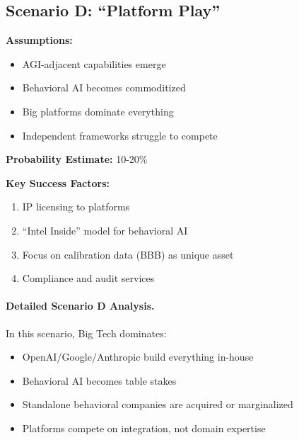 \subsection{Scenario D: ``Platform Play''}

\begin{tcolorbox}[colback=blue!5!white, colframe=blue!75!black,
    title=Scenario D: Platform Play]

\textbf{Assumptions:}
\begin{itemize}[nosep]
\item AGI-adjacent capabilities emerge
\item Behavioral AI becomes commoditized
\item Big platforms dominate everything
\item Independent frameworks struggle to compete
\end{itemize}

\textbf{Probability Estimate:} 10-20\%

\textbf{Key Success Factors:}
\begin{enumerate}[nosep]
\item IP licensing to platforms
\item ``Intel Inside'' model for behavioral AI
\item Focus on calibration data (BBB) as unique asset
\item Compliance and audit services
\end{enumerate}

\end{tcolorbox}

\paragraph{Detailed Scenario D Analysis.}

In this scenario, Big Tech dominates:
\begin{itemize}
\item OpenAI/Google/Anthropic build everything in-house
\item Behavioral AI becomes table stakes
\item Standalone behavioral companies are acquired or marginalized
\item Platforms compete on integration, not domain expertise
\end{itemize}

